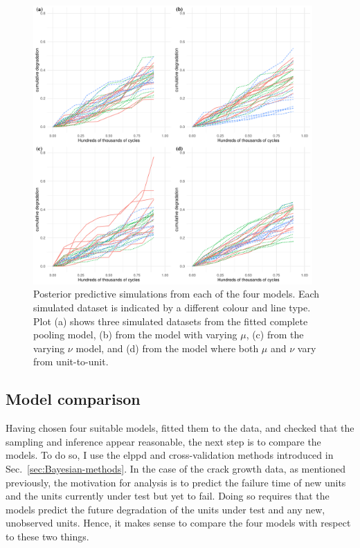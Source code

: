 \begin{figure}
   \centering
   \includegraphics[width=0.95\textwidth]{./figures/ch-5/post_pc.pdf}
   \caption{Posterior predictive simulations from each of the four models. Each simulated dataset is indicated by a different colour and line type. Plot (a) shows three simulated datasets from the fitted complete pooling model, (b) from the model with varying $\mu$, (c) from the varying $\nu$ model, and (d) from the model where both $\mu$ and $\nu$ vary from unit-to-unit.}
   \label{fig:post-pc} 
\end{figure}

\subsection{Model comparison}
\label{subsec:modcomp}

Having chosen four suitable models, fitted them to the data, and checked that the sampling and inference appear reasonable, the next step is to compare the models. To do so, I use the elppd and cross-validation methods introduced in Sec.~\ref{sec:Bayesian-methods}. In the case of the crack growth data, as mentioned previously, the motivation for analysis is to predict the failure time of new units and the units currently under test but yet to fail. Doing so requires that the models predict the future degradation of the units under test and any new, unobserved units. Hence, it makes sense to compare the four models with respect to these two things.

